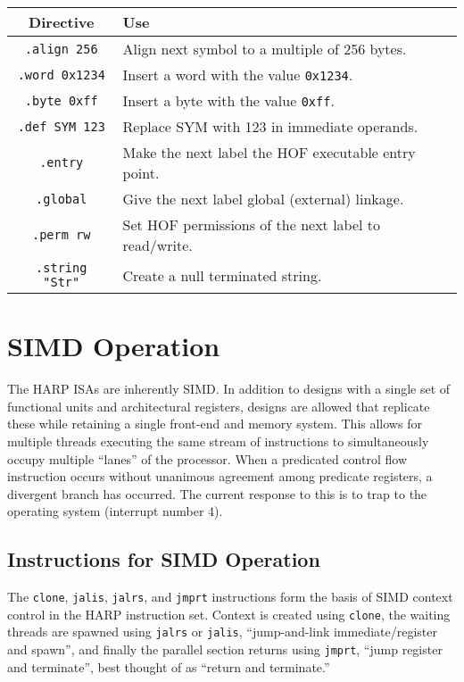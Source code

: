 \documentclass[10pt,letterpaper]{article}
\begin{document}
\begin{center}
\begin{tabular}{cl}
\textbf{Directive}&\textbf{Use}\\
\hline
\texttt{.align 256}    &Align next symbol to a multiple of 256 bytes.\\
\texttt{.word 0x1234}  &Insert a word with the value \texttt{0x1234}.\\
\texttt{.byte 0xff}    &Insert a byte with the value \texttt{0xff}.\\
\texttt{.def SYM 123}  &Replace SYM with 123 in immediate operands.\\
\texttt{.entry}        &Make the next label the HOF executable entry point.\\
\texttt{.global}       &Give the next label global (external) linkage.\\
\texttt{.perm rw}      &Set HOF permissions of the next label to read/write.\\
\texttt{.string "Str"} &Create a null terminated string.\\
\end{tabular}
\end{center}

\section*{SIMD Operation}
The HARP ISAs are inherently SIMD.
In addition to designs with a single set of functional units and architectural registers, designs are allowed that replicate these while retaining a single front-end and memory system.
This allows for multiple threads executing the same stream of instructions to simultaneously occupy multiple ``lanes'' of the processor.
When a predicated control flow instruction occurs without unanimous agreement among predicate registers, a divergent branch has occurred.
The current response to this is to trap to the operating system (interrupt number 4).

\subsection{Instructions for SIMD Operation}
The \texttt{clone}, \texttt{jalis}, \texttt{jalrs}, and \texttt{jmprt} instructions form the basis of SIMD context control in the HARP instruction set.
Context is created using \texttt{clone}, the waiting threads are spawned using \texttt{jalrs} or \texttt{jalis}, ``jump-and-link immediate/register and spawn'', and finally the parallel section returns using \texttt{jmprt}, ``jump register and terminate'', best thought of as ``return and terminate.''
\end{document}
